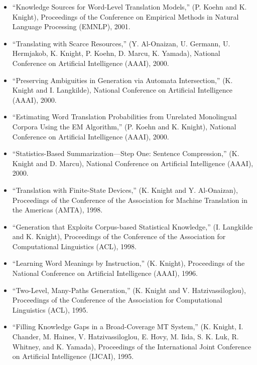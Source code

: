 \begin{itemize}
\item ``Knowledge Sources for Word-Level Translation Models,''
(P. Koehn and K. Knight), Proceedings of the Conference on
Empirical Methods in Natural Language Processing (EMNLP), 2001.

\item ``Translating with Scarce Resources,'' (Y. Al-Onaizan, 
U. Germann, U. Hermjakob, K. Knight, P. Koehn, D. Marcu, K. Yamada),
National Conference on Artificial Intelligence (AAAI), 2000. 

\item ``Preserving Ambiguities in Generation via Automata Intersection,'' 
(K. Knight and I. Langkilde), National Conference on Artificial
Intelligence (AAAI), 2000. 

\item ``Estimating Word Translation Probabilities from Unrelated 
Monolingual Corpora Using the EM Algorithm,'' (P. Koehn and K. Knight),
National Conference on Artificial Intelligence (AAAI), 2000. 

\item ``Statistics-Based Summarization---Step One: Sentence Compression,'' 
(K. Knight and D. Marcu), National Conference on Artificial
Intelligence (AAAI), 2000.  

\item ``Translation with Finite-State Devices,''
(K. Knight and Y. Al-Onaizan),
Proceedings of the Conference of the Association for Machine
Translation in the Americas (AMTA), 
1998.

\item ``Generation that Exploits Corpus-based Statistical Knowledge,''
(I. Langkilde and K. Knight), Proceedings of the Conference of the 
Association for Computational Linguistics (ACL), 1998.

\item ``Learning Word Meanings by Instruction,'' 
(K. Knight),
Proceedings of the National 
Conference on Artificial Intelligence (AAAI), 1996.

\item ``Two-Level, Many-Paths Generation,''
(K. Knight and V. Hatzivassiloglou), Proceedings of the Conference of the 
Association for Computational Linguistics (ACL), 1995.

\item ``Filling Knowledge Gaps in a Broad-Coverage MT System,''
(K. Knight, I. Chander, M. Haines, V. Hatzivassiloglou,
E. Hovy, M. Iida, S. K. Luk, R. Whitney,
and K. Yamada), Proceedings of the International Joint Conference on Artificial Intelligence (IJCAI), 1995.


\end{itemize}
